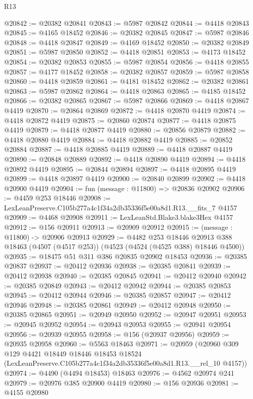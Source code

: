 \begin{lexlean}{R13}
\begin{coremodule}
@20842 := @20382 @20841
@20843 := @5987 @20842
@20844 := @4418 @20843
@20845 := @4165 @18452
@20846 := @20382 @20845
@20847 := @5987 @20846
@20848 := @4418 @20847
@20849 := @4169 @18452
@20850 := @20382 @20849
@20851 := @5987 @20850
@20852 := @4418 @20851
@20853 := @4173 @18452
@20854 := @20382 @20853
@20855 := @5987 @20854
@20856 := @4418 @20855
@20857 := @4177 @18452
@20858 := @20382 @20857
@20859 := @5987 @20858
@20860 := @4418 @20859
@20861 := @4181 @18452
@20862 := @20382 @20861
@20863 := @5987 @20862
@20864 := @4418 @20863
@20865 := @4185 @18452
@20866 := @20382 @20865
@20867 := @5987 @20866
@20869 := @4418 @20867 @4419
@20870 := @20864 @20869
@20872 := @4418 @20870 @4419
@20874 := @4418 @20872 @4419
@20875 := @20860 @20874
@20877 := @4418 @20875 @4419
@20879 := @4418 @20877 @4419
@20880 := @20856 @20879
@20882 := @4418 @20880 @4419
@20884 := @4418 @20882 @4419
@20885 := @20852 @20884
@20887 := @4418 @20885 @4419
@20889 := @4418 @20887 @4419
@20890 := @20848 @20889
@20892 := @4418 @20890 @4419
@20894 := @4418 @20892 @4419
@20895 := @20844 @20894
@20897 := @4418 @20895 @4419
@20899 := @4418 @20897 @4419
@20900 := @20840 @20899
@20902 := @4418 @20900 @4419
@20904 := fun (message : @11800) => @20836 @20902
@20906 := @4459 @253 @18446
@20908 := LexLeanPreserve.C105b277a4c1f34a2db35336f5e00a8d1.R13.__fits_7 @4157
@20909 := @4468 @20908
@20911 := LexLeanStd.Blake3.blake3Hex @4157
@20912 := @156 @20911
@20913 := @20909 @20912
@20915 := (message : @11800) -> @20906 @20913
@20929 := @4482
    @253
    @18446
    @20913
    @388
    @18463
    (@4507 (@4517 @253))
    (@4523 (@4524 (@4525 @388) @18446 @4500))
@20935 := @18475 @51 @311 @386 @20835 @20902 @18453
@20936 := @20385 @20837
@20937 := @20412 @20936
@20938 := @20385 @20841
@20939 := @20412 @20938
@20940 := @20385 @20845
@20941 := @20412 @20940
@20942 := @20385 @20849
@20943 := @20412 @20942
@20944 := @20385 @20853
@20945 := @20412 @20944
@20946 := @20385 @20857
@20947 := @20412 @20946
@20948 := @20385 @20861
@20949 := @20412 @20948
@20950 := @20385 @20865
@20951 := @20949 @20950
@20952 := @20947 @20951
@20953 := @20945 @20952
@20954 := @20943 @20953
@20955 := @20941 @20954
@20956 := @20939 @20955
@20958 := @156 (@20937 @20956)
@20959 := @20935 @20958
@20960 := @5563 @18463
@20971 := @20959
    (@20960
      @309
      @129
      @4421
      @18449
      @18446
      @18453
      @18524
      (LexLeanPreserve.C105b277a4c1f34a2db35336f5e00a8d1.R13.__rel_10 @4157))
@20974 := @4490 (@4494 @18453) @18463
@20976 := @4562 @20974 @241
@20979 := @20976 @385 @20900 @4419
@20980 := @156 @20936
@20981 := @4155 @20980

\end{coremodule}
\end{lexlean}

